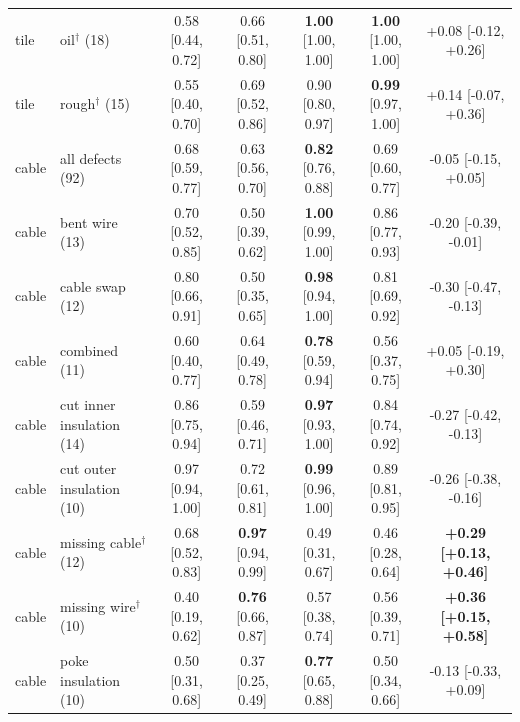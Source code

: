\begin{table}[t]
\begin{tabular}{llccccc}
tile & oil$^\dagger$ (18) & 0.58 {\scriptsize[0.44, 0.72]} & 0.66 {\scriptsize[0.51, 0.80]} & \textbf{1.00} {\scriptsize[1.00, 1.00]} & \textbf{1.00} {\scriptsize[1.00, 1.00]} & +0.08 {\scriptsize[-0.12, +0.26]} \\
tile & rough$^\dagger$ (15) & 0.55 {\scriptsize[0.40, 0.70]} & 0.69 {\scriptsize[0.52, 0.86]} & 0.90 {\scriptsize[0.80, 0.97]} & \textbf{0.99} {\scriptsize[0.97, 1.00]} & +0.14 {\scriptsize[-0.07, +0.36]} \\
\midrule
cable & all defects (92) & 0.68 {\scriptsize[0.59, 0.77]} & 0.63 {\scriptsize[0.56, 0.70]} & \textbf{0.82} {\scriptsize[0.76, 0.88]} & 0.69 {\scriptsize[0.60, 0.77]} & -0.05 {\scriptsize[-0.15, +0.05]} \\
cable & bent wire (13) & 0.70 {\scriptsize[0.52, 0.85]} & 0.50 {\scriptsize[0.39, 0.62]} & \textbf{1.00} {\scriptsize[0.99, 1.00]} & 0.86 {\scriptsize[0.77, 0.93]} & -0.20 {\scriptsize[-0.39, -0.01]} \\
cable & cable swap (12) & 0.80 {\scriptsize[0.66, 0.91]} & 0.50 {\scriptsize[0.35, 0.65]} & \textbf{0.98} {\scriptsize[0.94, 1.00]} & 0.81 {\scriptsize[0.69, 0.92]} & -0.30 {\scriptsize[-0.47, -0.13]} \\
cable & combined (11) & 0.60 {\scriptsize[0.40, 0.77]} & 0.64 {\scriptsize[0.49, 0.78]} & \textbf{0.78} {\scriptsize[0.59, 0.94]} & 0.56 {\scriptsize[0.37, 0.75]} & +0.05 {\scriptsize[-0.19, +0.30]} \\
cable & cut inner insulation (14) & 0.86 {\scriptsize[0.75, 0.94]} & 0.59 {\scriptsize[0.46, 0.71]} & \textbf{0.97} {\scriptsize[0.93, 1.00]} & 0.84 {\scriptsize[0.74, 0.92]} & -0.27 {\scriptsize[-0.42, -0.13]} \\
cable & cut outer insulation (10) & 0.97 {\scriptsize[0.94, 1.00]} & 0.72 {\scriptsize[0.61, 0.81]} & \textbf{0.99} {\scriptsize[0.96, 1.00]} & 0.89 {\scriptsize[0.81, 0.95]} & -0.26 {\scriptsize[-0.38, -0.16]} \\
cable & missing cable$^\dagger$ (12) & 0.68 {\scriptsize[0.52, 0.83]} & \textbf{0.97} {\scriptsize[0.94, 0.99]} & 0.49 {\scriptsize[0.31, 0.67]} & 0.46 {\scriptsize[0.28, 0.64]} & \textbf{+0.29 {\scriptsize[+0.13, +0.46]}} \\
cable & missing wire$^\dagger$ (10) & 0.40 {\scriptsize[0.19, 0.62]} & \textbf{0.76} {\scriptsize[0.66, 0.87]} & 0.57 {\scriptsize[0.38, 0.74]} & 0.56 {\scriptsize[0.39, 0.71]} & \textbf{+0.36 {\scriptsize[+0.15, +0.58]}} \\
cable & poke insulation (10) & 0.50 {\scriptsize[0.31, 0.68]} & 0.37 {\scriptsize[0.25, 0.49]} & \textbf{0.77} {\scriptsize[0.65, 0.88]} & 0.50 {\scriptsize[0.34, 0.66]} & -0.13 {\scriptsize[-0.33, +0.09]} \\
\bottomrule
\end{tabular}
\end{table}

